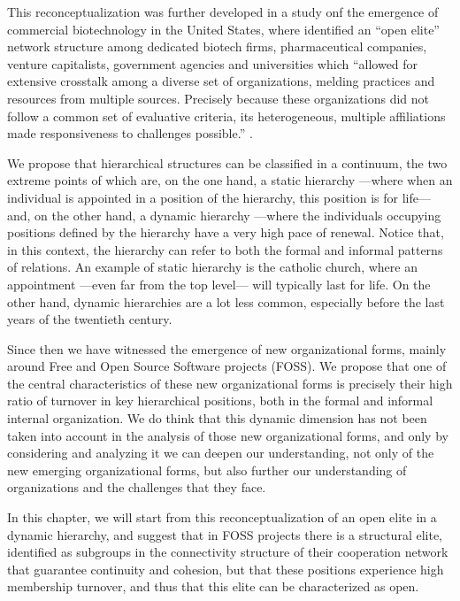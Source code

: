This reconceptualization was further developed in a study onf the emergence of commercial biotechnology in the United States, where \citet{powell:2005} identified an ``open elite'' network structure among dedicated biotech firms, pharmaceutical companies, venture capitalists, government agencies and universities which ``allowed for extensive crosstalk among a diverse set of organizations, melding practices and resources from multiple sources. Precisely because these organizations did not follow a common set of evaluative criteria, its heterogeneous, multiple affiliations made responsiveness to challenges possible.'' \citet[467]{powell:2005}.

We propose that hierarchical structures can be classified in a continuum, the two extreme points of which are, on the one hand, a static hierarchy ---where when an individual is appointed in a position of the hierarchy, this position is for life--- and, on the other hand, a dynamic hierarchy ---where the individuals occupying positions defined by the hierarchy have a very high pace of renewal. Notice that, in this context, the hierarchy can refer to both the formal and informal patterns of relations. An example of static hierarchy is the catholic church, where an appointment ---even far from the top level--- will typically last for life. On the other hand, dynamic hierarchies are a lot less common, especially before the last years of the twentieth century.

Since then we have witnessed the emergence of new organizational forms, mainly around Free and Open Source Software projects (FOSS). We propose that one of the central characteristics of these new organizational forms is precisely their high ratio of turnover in key hierarchical positions, both in the formal and informal internal organization. We do think that this dynamic dimension has not been taken into account in the analysis of those new organizational forms, and only by considering and analyzing it we can deepen our understanding, not only of the new emerging organizational forms, but also further our understanding of organizations and the challenges that they face.

In this chapter, we will start from this reconceptualization of an open elite in a dynamic hierarchy, and suggest that in FOSS projects there is a structural elite, identified as subgroups in the connectivity structure of their cooperation network that guarantee continuity and cohesion, but that these positions experience high membership turnover, and thus that this elite can be characterized as open.


